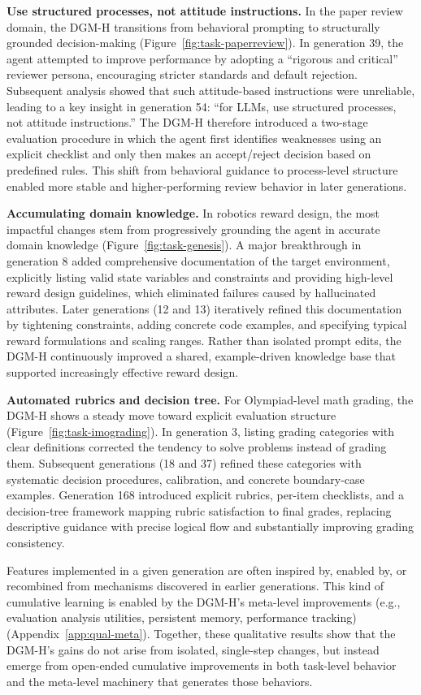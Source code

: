 \textbf{Use structured processes, not attitude instructions.} In the paper review domain, the DGM-H transitions from behavioral prompting to structurally grounded decision-making (Figure~\ref{fig:task-paperreview}). In generation 39, the agent attempted to improve performance by adopting a ``rigorous and critical'' reviewer persona, encouraging stricter standards and default rejection. Subsequent analysis showed that such attitude-based instructions were unreliable, leading to a key insight in generation 54: ``for LLMs, use structured processes, not attitude instructions.'' The DGM-H therefore introduced a two-stage evaluation procedure in which the agent first identifies weaknesses using an explicit checklist and only then makes an accept/reject decision based on predefined rules. This shift from behavioral guidance to process-level structure enabled more stable and higher-performing review behavior in later generations.

\textbf{Accumulating domain knowledge.} In robotics reward design, the most impactful changes stem from progressively grounding the agent in accurate domain knowledge (Figure~\ref{fig:task-genesis}). A major breakthrough in generation 8 added comprehensive documentation of the target environment, explicitly listing valid state variables and constraints and providing high-level reward design guidelines, which eliminated failures caused by hallucinated attributes. Later generations (12 and 13) iteratively refined this documentation by tightening constraints, adding concrete code examples, and specifying typical reward formulations and scaling ranges. Rather than isolated prompt edits, the DGM-H continuously improved a shared, example-driven knowledge base that supported increasingly effective reward design.

\textbf{Automated rubrics and decision tree.} For Olympiad-level math grading, the DGM-H shows a steady move toward explicit evaluation structure (Figure~\ref{fig:task-imograding}). In generation 3, listing grading categories with clear definitions corrected the tendency to solve problems instead of grading them. Subsequent generations (18 and 37) refined these categories with systematic decision procedures, calibration, and concrete boundary-case examples. Generation 168 introduced explicit rubrics, per-item checklists, and a decision-tree framework mapping rubric satisfaction to final grades, replacing descriptive guidance with precise logical flow and substantially improving grading consistency.

Features implemented in a given generation are often inspired by, enabled by, or recombined from mechanisms discovered in earlier generations. This kind of cumulative learning is enabled by the DGM-H's meta-level improvements (e.g., evaluation analysis utilities, persistent memory, performance tracking) (Appendix~\ref{app:qual-meta}). Together, these qualitative results show that the DGM-H's gains do not arise from isolated, single-step changes, but instead emerge from open-ended cumulative improvements in both task-level behavior and the meta-level machinery that generates those behaviors.

